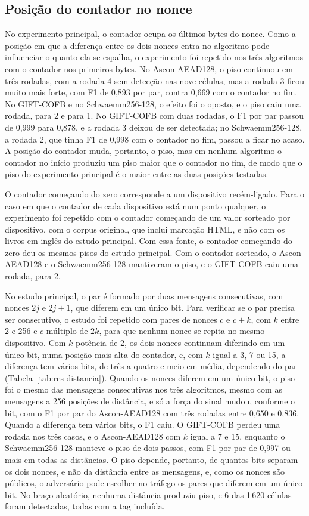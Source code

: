 \subsection{Posição do contador no nonce}
\label{sec:res-contador}

No experimento principal, o contador ocupa os últimos bytes do nonce. Como a posição em que a diferença entre os dois nonces entra no algoritmo pode influenciar o quanto ela se espalha, o experimento foi repetido nos três algoritmos com o contador nos primeiros bytes. No Ascon-AEAD128, o piso continuou em três rodadas, com a rodada 4 sem detecção nas nove células, mas a rodada 3 ficou muito mais forte, com F1 de 0,893 por par, contra 0,669 com o contador no fim. No GIFT-COFB e no Schwaemm256-128, o efeito foi o oposto, e o piso caiu uma rodada, para 2 e para 1. No GIFT-COFB com duas rodadas, o F1 por par passou de 0,999 para 0,878, e a rodada 3 deixou de ser detectada; no Schwaemm256-128, a rodada 2, que tinha F1 de 0,998 com o contador no fim, passou a ficar no acaso. A posição do contador muda, portanto, o piso, mas em nenhum algoritmo o contador no início produziu um piso maior que o contador no fim, de modo que o piso do experimento principal é o maior entre as duas posições testadas.

O contador começando do zero corresponde a um dispositivo recém-ligado. Para o caso em que o contador de cada dispositivo está num ponto qualquer, o experimento foi repetido com o contador começando de um valor sorteado por dispositivo, com o corpus original, que inclui marcação HTML, e não com os livros em inglês do estudo principal. Com essa fonte, o contador começando do zero deu os mesmos pisos do estudo principal. Com o contador sorteado, o Ascon-AEAD128 e o Schwaemm256-128 mantiveram o piso, e o GIFT-COFB caiu uma rodada, para 2.

No estudo principal, o par é formado por duas mensagens consecutivas, com nonces $2j$ e $2j+1$, que diferem em um único bit. Para verificar se o par precisa ser consecutivo, o estudo foi repetido com pares de nonces $c$ e $c+k$, com $k$ entre 2 e 256 e $c$ múltiplo de $2k$, para que nenhum nonce se repita no mesmo dispositivo. Com $k$ potência de 2, os dois nonces continuam diferindo em um único bit, numa posição mais alta do contador, e, com $k$ igual a 3, 7 ou 15, a diferença tem vários bits, de três a quatro e meio em média, dependendo do par (Tabela~\ref{tab:res-distancia}). Quando os nonces diferem em um único bit, o piso foi o mesmo das mensagens consecutivas nos três algoritmos, mesmo com as mensagens a 256 posições de distância, e só a força do sinal mudou, conforme o bit, com o F1 por par do Ascon-AEAD128 com três rodadas entre 0,650 e 0,836. Quando a diferença tem vários bits, o F1 caiu. O GIFT-COFB perdeu uma rodada nos três casos, e o Ascon-AEAD128 com $k$ igual a 7 e 15, enquanto o Schwaemm256-128 manteve o piso de dois passos, com F1 por par de 0,997 ou mais em todas as distâncias. O piso depende, portanto, de quantos bits separam os dois nonces, e não da distância entre as mensagens, e, como os nonces são públicos, o adversário pode escolher no tráfego os pares que diferem em um único bit. No braço aleatório, nenhuma distância produziu piso, e 6 das 1\,620 células foram detectadas, todas com a tag incluída.

